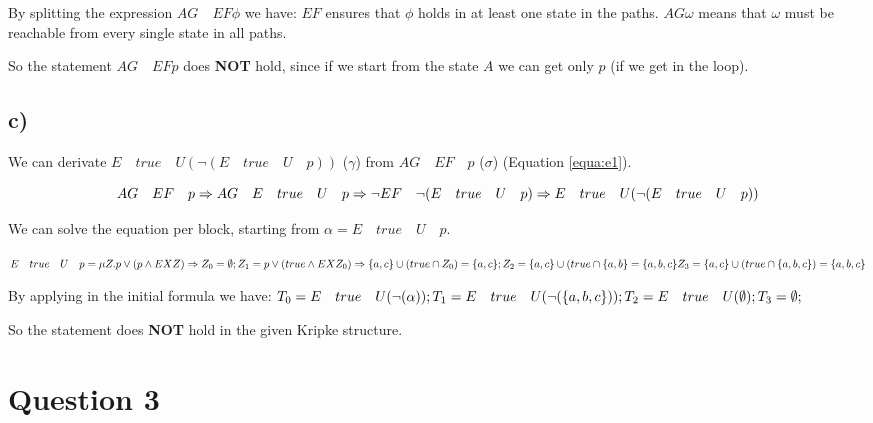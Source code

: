 \documentclass[a4paper]{article}
\begin{document}
By splitting the expression $ AG \quad EF \phi $ we have: $ EF $ ensures that $ \phi $ holds in at least one state in the paths. $AG \omega $ means that $ \omega $ must be reachable from every single state in all paths.

So the statement $AG \quad EF p $ does \textbf{NOT} hold, since if we start from the state $A$ we can get only $p$ (if we get in the loop).

\subsection*{c)}

We can derivate $E \quad true \quad U (\neg ( E \quad true \quad U \quad p ))$ ($\gamma$) from $AG \quad EF \quad p$ ($\sigma$) (Equation \ref{equa:e1}).

\begin{equation}
AG \quad EF \quad p \Rightarrow \newline
AG \quad E \quad true \quad U \quad p \Rightarrow \newline
\neg EF \quad \neg ( E \quad true \quad U \quad p ) \Rightarrow \newline
E \quad true \quad U (\neg ( E \quad true \quad U \quad p ))
\label{equa:e1}
\end{equation}
 
We can solve the equation per block, starting from $\alpha=E\quad true \quad U \quad p$.

$
E\quad true \quad U \quad p=\mu Z. p \lor (p \land EX Z) \Rightarrow \newline 
Z_0=\emptyset; \newline
Z_1=p \lor ( true \land EX Z_0 ) \Rightarrow \{a,c\} \cup (true \cap  Z_0) = \{a,c\} ; \newline
Z_2=\{a,c\} \cup ( true \cap \{a,b\} = \{a,b,c\} \newline
Z_3=\{a,c\} \cup ( true \cap  \{a,b,c\} ) = \{a,b,c\} \newline
$

By applying in the initial formula we have:
$
T_0=E \quad true \quad U (\neg ( \alpha )); \newline
T_1=E \quad true \quad U (\neg ( \{a,b,c\} )); \newline
T_2=E \quad true \quad U (\emptyset); \newline
T_3=\emptyset;
$ 

So the statement does \textbf{NOT} hold in the given Kripke structure.

\section{Question 3}
\end{document}
